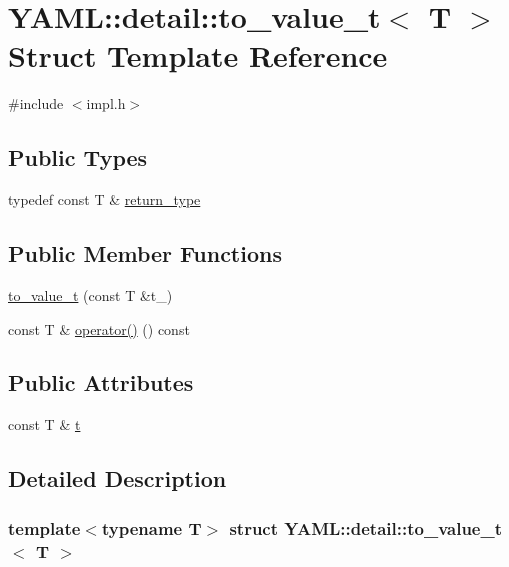 \hypertarget{struct_y_a_m_l_1_1detail_1_1to__value__t}{}\section{Y\+A\+ML\+::detail\+::to\+\_\+value\+\_\+t$<$ T $>$ Struct Template Reference}
\label{struct_y_a_m_l_1_1detail_1_1to__value__t}


{\ttfamily \#include $<$impl.\+h$>$}

\subsection*{Public Types}
\begin{DoxyCompactItemize}
\item 
typedef const T \& \mbox{\hyperlink{struct_y_a_m_l_1_1detail_1_1to__value__t_a1544f408af56e9ddc3b9f5e1b249fe00}{return\+\_\+type}}
\end{DoxyCompactItemize}
\subsection*{Public Member Functions}
\begin{DoxyCompactItemize}
\item 
\mbox{\hyperlink{struct_y_a_m_l_1_1detail_1_1to__value__t_ada645757dab7cb3fc901e6edb6b13bd4}{to\+\_\+value\+\_\+t}} (const T \&t\+\_\+)
\item 
const T \& \mbox{\hyperlink{struct_y_a_m_l_1_1detail_1_1to__value__t_a46c8b856417caab314100d558830ebd5}{operator()}} () const
\end{DoxyCompactItemize}
\subsection*{Public Attributes}
\begin{DoxyCompactItemize}
\item 
const T \& \mbox{\hyperlink{struct_y_a_m_l_1_1detail_1_1to__value__t_ab10b31733447ebf0e282f7500734e09b}{t}}
\end{DoxyCompactItemize}


\subsection{Detailed Description}
\subsubsection*{template$<$typename T$>$\newline
struct Y\+A\+M\+L\+::detail\+::to\+\_\+value\+\_\+t$<$ T $>$}



